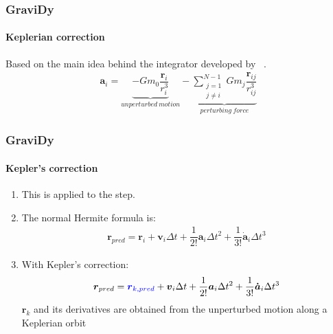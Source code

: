 \begin{frame}[fragile]
    \frametitle{GraviDy}
    \framesubtitle{Keplerian correction}
    Based on the main idea behind the integrator developed by ~\cite{2006IAUJD...6E..24L}.
    \begin{eqnarray}
        \boldsymbol{a}_{i} =   \underbrace{ - G m_{0}
                                          \dfrac{\boldsymbol{r}_{i}}{r_{i}^{3}}
                                          }_{unperturbed\ motion}
                             - \underbrace{ \sum\limits_{\substack{j=1\\j\neq i}}^{N-1}
                                            G m_{j} \dfrac{\boldsymbol{r}_{ij}}{r_{ij}^{3}}
                                          }_{perturbing\ force}
    \end{eqnarray}
\end{frame}

\begin{frame}
    \frametitle{GraviDy}
    \framesubtitle{Kepler's correction}
    \begin{enumerate}
        \item This is applied to the  step.
        \item The normal Hermite formula is:
        \begin{eqnarray}
            \boldsymbol{r}_{pred} =    \boldsymbol{      r}_{i}              +
                                       \boldsymbol{      v}_{i} \Delta t     +
                         \dfrac{1}{2!} \boldsymbol{      a}_{i} \Delta t^{2} +
                         \dfrac{1}{3!} \boldsymbol{\dot{a}}_{i} \Delta t^{3}
        \end{eqnarray}
        \item With Kepler's correction:
        \begin{eqnarray}
            \boldsymbol{r}_{pred} =    \textcolor{blue}{\boldsymbol{      r}_{k,pred}}         +
                                             \boldsymbol{      v}_{i} \Delta t     +
                         \dfrac{1}{2!}       \boldsymbol{      a}_{i} \Delta t^{2} +
                         \dfrac{1}{3!}       \boldsymbol{\dot{a}}_{i} \Delta t^{3}
        \end{eqnarray}
        $\boldsymbol{r}_{k}$ and its derivatives 
            are obtained from the unperturbed motion along a Keplerian orbit

    \end{enumerate}
\end{frame}

